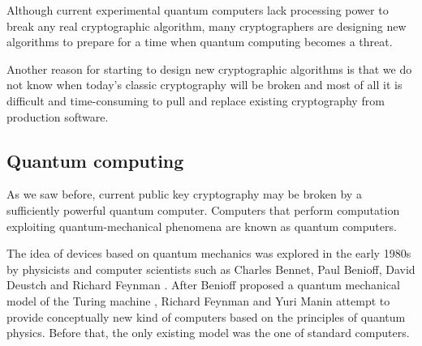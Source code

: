 \documentclass[a4paper,12pt]{article}
\begin{document}
Although current experimental quantum computers lack processing power to break any real cryptographic algorithm, many cryptographers are designing new algorithms to prepare for a time when quantum computing becomes a threat.

Another reason for starting to design new cryptographic algorithms is that we do not know when today's classic cryptography will be broken and most of all it is difficult and time-consuming to pull and replace existing cryptography from production software.


\subsection{Quantum computing}
\label{sub:qc}

As we saw before, current public key cryptography may be broken by a sufficiently powerful quantum computer. Computers that perform computation exploiting quantum-mechanical phenomena are known as quantum computers.

The idea of devices based on quantum mechanics was explored in the early 1980s by physicists and computer scientists such as Charles Bennet, Paul Benioff, David Deustch and Richard Feynman \cite{16_Quantum}. After Benioff proposed a quantum mechanical model of the Turing machine \cite{38_BeniofTuringQuantum}, Richard Feynman and Yuri Manin attempt to provide conceptually new kind of computers based on the principles of quantum physics.
Before that, the only existing model was the one of standard computers.
\end{document}
